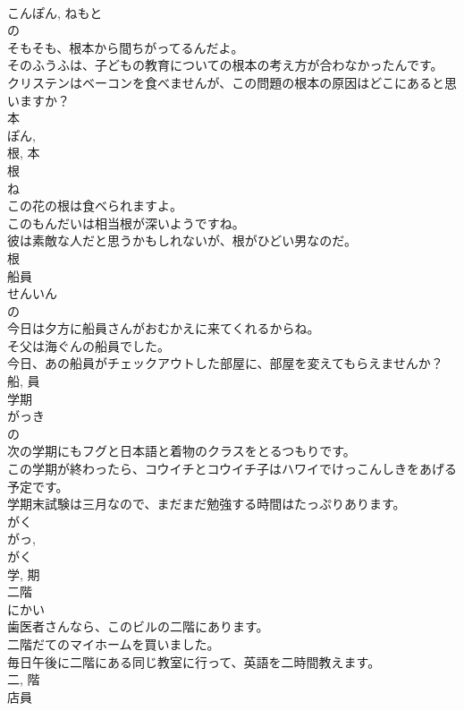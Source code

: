 \documentclass[8pt]{extreport}
\begin{document}
\begin{CJK}{UTF8}{min}
\\	こんぽん, ねもと	
\\	の 
\\	そもそも、根本から間ちがってるんだよ。	
\\	そのふうふは、子どもの教育についての根本の考え方が合わなかったんです。	
\\	クリステンはベーコンを食べませんが、この問題の根本の原因はどこにあると思いますか？	
\\	本 
\\	ぽん, 
\\	根, 本	
\\	根	
\\	ね	
\\	この花の根は食べられますよ。	
\\	このもんだいは相当根が深いようですね。	
\\	彼は素敵な人だと思うかもしれないが、根がひどい男なのだ。	
\\	根	
\\	船員	
\\	せんいん	
\\	の 
\\	今日は夕方に船員さんがおむかえに来てくれるからね。	
\\	そ父は海ぐんの船員でした。	
\\	今日、あの船員がチェックアウトした部屋に、部屋を変えてもらえませんか？	
\\	船, 員	
\\	学期	
\\	がっき	
\\	の 
\\	次の学期にもフグと日本語と着物のクラスをとるつもりです。	
\\	この学期が終わったら、コウイチとコウイチ子はハワイでけっこんしきをあげる予定です。	
\\	学期末試験は三月なので、まだまだ勉強する時間はたっぷりあります。	
\\	がく 
\\	がっ, 
\\	がく 
\\	学, 期	
\\	二階	
\\	にかい	
\\	歯医者さんなら、このビルの二階にあります。	
\\	二階だてのマイホームを買いました。	
\\	毎日午後に二階にある同じ教室に行って、英語を二時間教えます。	
\\	二, 階	
\\	店員	

\end{CJK}
\end{document}
